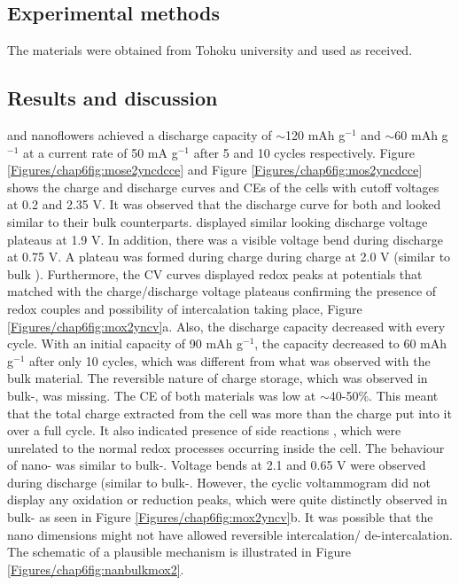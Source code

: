 \subsection{Experimental methods}
The materials were obtained from Tohoku university and used as received. 

\subsection{Results and discussion}
 and  nanoflowers achieved a discharge capacity of $\sim$120 mAh g$^{-1}$ and $\sim$60 mAh g$^{-1}$ at a current rate of 50 mA g$^{-1}$ after 5 and 10 cycles respectively. Figure \ref{Figures/chap6fig:mose2yncdcce} and Figure \ref{Figures/chap6fig:mos2yncdcce} shows the charge and discharge curves and CEs of the cells with cutoff voltages at 0.2 and 2.35 V. It was observed that the discharge curve for both  and  looked similar to their bulk counterparts.  displayed similar looking discharge voltage plateaus at 1.9 V. In addition, there was a visible voltage bend during discharge at 0.75 V. A plateau was formed during charge during charge at 2.0 V (similar to bulk ). Furthermore, the CV curves displayed redox peaks at potentials that matched with the charge/discharge voltage plateaus confirming the presence of redox couples and possibility of intercalation taking place, Figure \ref{Figures/chap6fig:mox2yncv}a. Also, the discharge capacity decreased with every cycle. With an initial capacity of 90 mAh g$^{-1}$, the capacity decreased to 60 mAh g$^{-1}$ after only 10 cycles, which was different from what was observed with the bulk material. The reversible nature of charge storage, which was observed in bulk-, was missing. The CE of both materials was low at $\sim$40-50\%. This meant that the total charge extracted from the cell was more than the charge put into it over a full cycle. It also indicated presence of side reactions , which were unrelated to the normal redox processes occurring inside the cell. The behaviour of nano- was similar to bulk-. Voltage bends at 2.1 and 0.65 V were observed during discharge (similar to bulk-. However, the cyclic voltammogram did not display any oxidation or reduction peaks, which were quite distinctly observed in bulk- as seen in Figure \ref{Figures/chap6fig:mox2yncv}b. It was possible that the nano dimensions might not have allowed reversible intercalation/ de-intercalation. The schematic of a plausible mechanism is illustrated in Figure \ref{Figures/chap6fig:nanbulkmox2}. 

